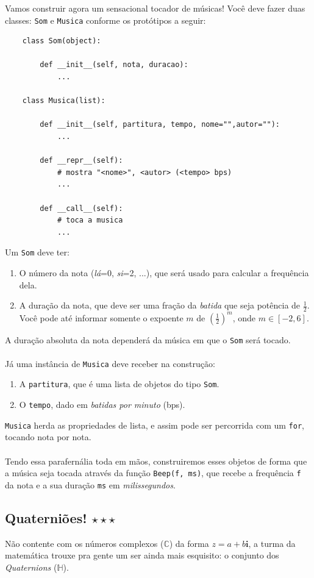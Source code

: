 \documentclass[12pt]{article}
\newcommand{\mono}[1]{\texttt{#1}}
\newcommand{\mb}[1]{\mathbf{#1}}
\begin{document}
	Vamos construir agora um sensacional tocador de músicas! Você deve fazer duas classes: \mono{Som} e \mono{Musica} conforme os protótipos a seguir:
	
	\begin{verbatim}
	class Som(object):
	
	    def __init__(self, nota, duracao):
	        ...
	        
	class Musica(list):
	
	    def __init__(self, partitura, tempo, nome="",autor=""):
	        ...
	        
	    def __repr__(self):
	        # mostra "<nome>", <autor> (<tempo> bps)
	        ...
	        
	    def __call__(self):
	        # toca a musica
	        ...
	\end{verbatim}
	Um \mono{Som} deve ter:
	\begin{enumerate}
		\item O número da nota (\emph{lá}=0, \emph{si}=2, ...), que será usado para calcular a frequência dela.
		\item A duração da nota, que deve ser uma fração da \emph{batida} que seja potência de $\frac{1}{2}$. Você pode até informar somente o expoente $m$ de $(\frac{1}{2})^{m}$, onde $m \in [-2, 6]$.
	\end{enumerate}
	A duração absoluta da nota dependerá da música em que o \mono{Som} será tocado.
	\\ \\
	Já uma instância de \mono{Musica} deve receber na construção:
	\begin{enumerate}
		\item A \mono{partitura}, que é uma lista de objetos do tipo \mono{Som}.
		\item O \mono{tempo}, dado em \emph{batidas por minuto} (bps).
	\end{enumerate}
	\mono{Musica} herda as propriedades de lista, e assim pode ser percorrida com um \mono{for}, tocando nota por nota.
	\\ \\
	Tendo essa parafernália toda em mãos, construiremos esses objetos de forma que a música seja tocada através da função \mono{Beep(f, ms)}, que recebe a frequência \mono{f} da nota e a sua duração \mono{ms} em \emph{milissegundos}.

	\subsection{Quaterniões! $\star\star\star$}
	Não contente com os números complexos ($\mathbb{C}$) da forma $z = a + b\mb{i}$, a turma da matemática trouxe pra gente um ser ainda mais esquisito: o conjunto dos \emph{Quaternions} ($\mathbb{H}$).
	
\end{document}
